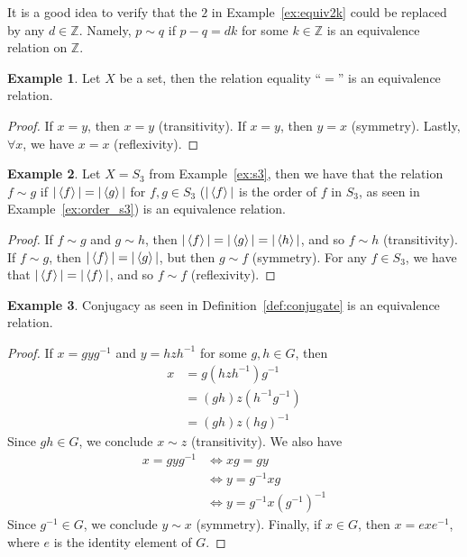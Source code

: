 \documentclass[12pt,letterpaper,DIV=11,final]{scrartcl}
\theoremstyle{plain}
\theoremstyle{definition}
\newtheorem{example}{Example}[section]
\theoremstyle{remark}
\begin{document}
It is a good idea to verify that the $2$ in Example~\ref{ex:equiv2k} could be replaced by any $d \in \mathbb{Z}$.
Namely, $p \sim q$ if $p - q = dk$ for some $k \in \mathbb{Z}$ is an equivalence relation on $\mathbb{Z}$.

\begin{example}
  Let $X$ be a set, then the relation equality \enquote{$=$} is an equivalence relation.

  \begin{proof}
    If $x = y$, then $x = y$ (transitivity).
    If $x = y$, then $y = x$ (symmetry).
    Lastly, $\forall x$, we have $x = x$ (reflexivity).
  \end{proof}
\end{example}

\begin{example}
  Let $X = S_3$ from Example~\ref{ex:s3}, then we have that the relation $f \sim g$ if $|\braket{f}| = |\braket{g}|$ for $f, g \in S_3$ ($|\braket{f}|$ is the order of $f$ in $S_3$, as seen in Example~\ref{ex:order_s3}) is an equivalence relation.

  \begin{proof}
    If $f \sim g$ and $g \sim h$, then $|\braket{f}| = |\braket{g}| = |\braket{h}|$, and so $f \sim h$ (transitivity).
    If $f \sim g$, then $|\braket{f}| = |\braket{g}|$, but then $g \sim f$ (symmetry).
    For any $f \in S_3$, we have that $|\braket{f}| = |\braket{f}|$, and so $f \sim f$ (reflexivity).
  \end{proof}
\end{example}

\begin{example}
  Conjugacy as seen in Definition~\ref{def:conjugate} is an equivalence relation.

  \begin{proof}
    If $x = g y g^{-1}$ and $y = h z h^{-1}$ for some $g, h \in G$, then
    \begin{align*}
      x &= g (h z h^{-1}) g^{-1} \\
        &= (gh) z (h^{-1} g^{-1}) \\
        &= (gh) z {(h g)}^{-1}
    \end{align*}
    Since $gh \in G$, we conclude $x \sim z$  (transitivity).
    We also have
    \begin{align*}
      x = g y g^{-1} &\iff xg = gy \\
                     &\iff y = g^{-1} x g \\
                     &\iff y = g^{-1} x {(g^{-1})}^{-1}
    \end{align*}
    Since $g^{-1} \in G$, we conclude $y \sim x$ (symmetry).
    Finally, if $x \in G$, then $x = e x e^{-1}$, where $e$ is the identity element of $G$.
  \end{proof}
\end{example}
\end{document}
